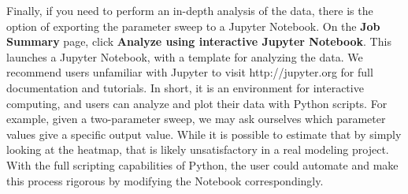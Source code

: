 Finally, if you need to perform an in-depth analysis of the data, there is the option of exporting the parameter sweep to a Jupyter Notebook. On the \textbf{Job Summary} page, click \textbf{Analyze using interactive Jupyter Notebook}. This launches a Jupyter Notebook, with a template for analyzing the data. We recommend users unfamiliar with Jupyter to visit http://jupyter.org for full documentation and tutorials. In short, it is an environment for interactive computing, and users can analyze and plot their data with Python scripts. For example, given a two-parameter sweep, we may ask ourselves which parameter values give a specific output value. While it is possible to estimate that by simply looking at the heatmap, that is likely unsatisfactory in a real modeling project. With the full scripting capabilities of Python, the user could automate and make this process rigorous by modifying the Notebook correspondingly.

